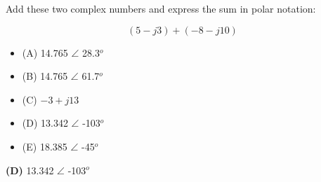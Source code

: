 

Add these two complex numbers and express the sum in polar notation:

$$(5 - j3) + (-8 - j10)$$

\begin{itemize}
\item{(A)} 14.765 $\angle$ 28.3$^{o}$
\vskip 5pt 
\item{(B)} 14.765 $\angle$ 61.7$^{o}$
\vskip 5pt 
\item{(C)} $-3 + j13$
\vskip 5pt 
\item{(D)} 13.342 $\angle$ -103$^{o}$
\vskip 5pt 
\item{(E)} 18.385 $\angle$ -45$^{o}$
\end{itemize}







{\bf (D)} 13.342 $\angle$ -103$^{o}$
 










